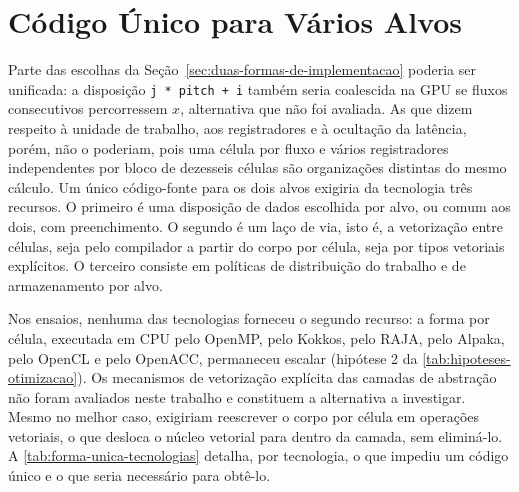 \section{Código Único para Vários Alvos}\label{sec:codigo-unico-alvos}

Parte das escolhas da Seção~\ref{sec:duas-formas-de-implementacao} poderia ser unificada: a disposição \texttt{j * pitch + i} também seria coalescida na GPU se fluxos consecutivos percorressem $x$, alternativa que não foi avaliada.
As que dizem respeito à unidade de trabalho, aos registradores e à ocultação da latência, porém, não o poderiam, pois uma célula por fluxo e vários registradores independentes por bloco de dezesseis células são organizações distintas do mesmo cálculo.
Um único código-fonte para os dois alvos exigiria da tecnologia três recursos.
O primeiro é uma disposição de dados escolhida por alvo, ou comum aos dois, com preenchimento.
O segundo é um laço de via, isto é, a vetorização entre células, seja pelo compilador a partir do corpo por célula, seja por tipos vetoriais explícitos.
O terceiro consiste em políticas de distribuição do trabalho e de armazenamento por alvo.

Nos ensaios, nenhuma das tecnologias forneceu o segundo recurso: a forma por célula, executada em CPU pelo OpenMP, pelo Kokkos, pelo RAJA, pelo Alpaka, pelo OpenCL e pelo OpenACC, permaneceu escalar (hipótese 2 da \autoref{tab:hipoteses-otimizacao}).
Os mecanismos de vetorização explícita das camadas de abstração não foram avaliados neste trabalho e constituem a alternativa a investigar.
Mesmo no melhor caso, exigiriam reescrever o corpo por célula em operações vetoriais, o que desloca o núcleo vetorial para dentro da camada, sem eliminá-lo.
A \autoref{tab:forma-unica-tecnologias} detalha, por tecnologia, o que impediu um código único e o que seria necessário para obtê-lo.

